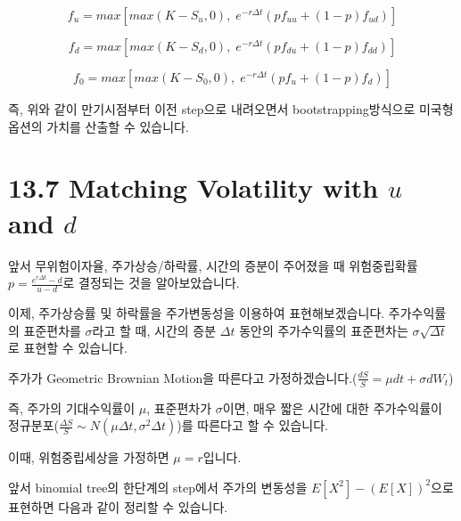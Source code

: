 \documentclass[
  letterpaper,
  DIV=11,
  numbers=noendperiod]{scrreprt}
\begin{document}
\[f_u=max[max(K-S_u,0),\;e^{-r\Delta t}(pf_{uu}+(1-p)f_{ud})]\]

\[f_d=max[max(K-S_d,0),\;e^{-r\Delta t}(pf_{du}+(1-p)f_{dd})]\]

\[f_0=max[max(K-S_0,0),\;e^{-r\Delta t}(pf_u+(1-p)f_d)]\]

즉, 위와 같이 만기시점부터 이전 step으로 내려오면서
bootstrapping방식으로 미국형 옵션의 가치를 산출할 수 있습니다.

\section*{\texorpdfstring{13.7 Matching Volatility with \(u\) and
\(d\)}{13.7 Matching Volatility with u and d}}\label{matching-volatility-with-u-and-d}


앞서 무위험이자율, 주가상승/하락률, 시간의 증분이 주어졌을 때
위험중립확률 \(p=\frac{e^{r\Delta t}-d}{u-d}\)로 결정되는 것을
알아보았습니다.

이제, 주가상승률 및 하락률을 주가변동성을 이용하여 표현해보겠습니다.
주가수익률의 표준편차를 \(\sigma\)라고 할 때, 시간의 증분 \(\Delta t\)
동안의 주가수익률의 표준편차는 \(\sigma\sqrt{\Delta t}\)로 표현할 수
있습니다.

\begin{tcolorbox}[enhanced jigsaw, titlerule=0mm, bottomtitle=1mm, left=2mm, title=\textcolor{quarto-callout-important-color}{\faExclamation}\hspace{0.5em}{Chapter 15 : 주요 내용}, toptitle=1mm, bottomrule=.15mm, colframe=quarto-callout-important-color-frame, breakable, opacityback=0, rightrule=.15mm, opacitybacktitle=0.6, coltitle=black, colback=white, arc=.35mm, colbacktitle=quarto-callout-important-color!10!white, toprule=.15mm, leftrule=.75mm]

주가가 Geometric Brownian Motion을 따른다고
가정하겠습니다.(\(\frac{dS}{S}=\mu dt+\sigma dW_t\))

즉, 주가의 기대수익률이 \(\mu\), 표준편차가 \(\sigma\)이면, 매우 짧은
시간에 대한 주가수익률이
정규분포(\(\frac{\Delta S}{S}\sim N(\mu\Delta t,\sigma^2\Delta t)\))를
따른다고 할 수 있습니다.

이때, 위험중립세상을 가정하면 \(\mu=r\)입니다.

\end{tcolorbox}

앞서 binomial tree의 한단계의 step에서 주가의 변동성을
\(E[X^2]-(E[X])^2\)으로 표현하면 다음과 같이 정리할 수 있습니다.
\end{document}
